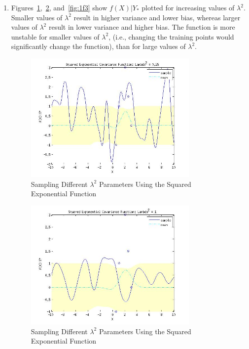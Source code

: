 \documentclass{article}
\begin{document}
\begin{enumerate}[label=(\alph*)]
\item Figures~\ref{fig:1f1},~\ref{fig:1f2}, and~\ref{fig:1f3} show $f(X)|Y_\ast$ plotted for increasing values of $\lambda^2$.
Smaller values of $\lambda^2$ result in higher variance and lower bias, whereas larger values
of $\lambda^2$ result in lower variance and higher bias. The function is more unstable for smaller values
of $\lambda^2$, (i.e., changing the training points would significantly change the function), 
than for large values of $\lambda^2$.


\begin{figure}[H]
\centering
\includegraphics[width=0.8\textwidth]{1_f_1.jpg}
\caption{Sampling Different $\lambda^2$ Parameters Using the Squared Exponential Function}
\label{fig:1f1}
\end{figure}

\begin{figure}[H]
\centering
\includegraphics[width=0.8\textwidth]{1_f_2.jpg}
\caption{Sampling Different $\lambda^2$ Parameters Using the Squared Exponential Function}
\label{fig:1f2}
\end{figure}


\end{enumerate}
\end{document}
